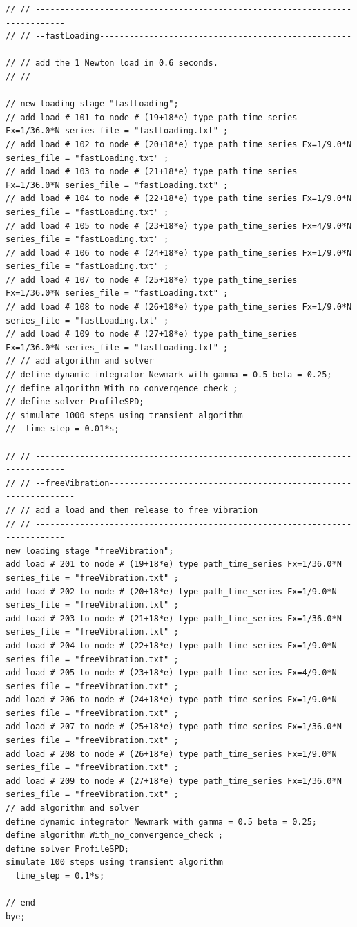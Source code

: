 \documentclass[fleqn,11pt]{article}
\begin{document}
\begin{lstlisting}
// // ----------------------------------------------------------------------------
// // --fastLoading---------------------------------------------------------------
// // add the 1 Newton load in 0.6 seconds.
// // ----------------------------------------------------------------------------
// new loading stage "fastLoading";
// add load # 101 to node # (19+18*e) type path_time_series Fx=1/36.0*N series_file = "fastLoading.txt" ; 
// add load # 102 to node # (20+18*e) type path_time_series Fx=1/9.0*N series_file = "fastLoading.txt" ; 
// add load # 103 to node # (21+18*e) type path_time_series Fx=1/36.0*N series_file = "fastLoading.txt" ; 
// add load # 104 to node # (22+18*e) type path_time_series Fx=1/9.0*N series_file = "fastLoading.txt" ; 
// add load # 105 to node # (23+18*e) type path_time_series Fx=4/9.0*N series_file = "fastLoading.txt" ; 
// add load # 106 to node # (24+18*e) type path_time_series Fx=1/9.0*N series_file = "fastLoading.txt" ; 
// add load # 107 to node # (25+18*e) type path_time_series Fx=1/36.0*N series_file = "fastLoading.txt" ; 
// add load # 108 to node # (26+18*e) type path_time_series Fx=1/9.0*N series_file = "fastLoading.txt" ; 
// add load # 109 to node # (27+18*e) type path_time_series Fx=1/36.0*N series_file = "fastLoading.txt" ; 
// // add algorithm and solver
// define dynamic integrator Newmark with gamma = 0.5 beta = 0.25;
// define algorithm With_no_convergence_check ;
// define solver ProfileSPD;
// simulate 1000 steps using transient algorithm 
//  time_step = 0.01*s;

// // ----------------------------------------------------------------------------
// // --freeVibration---------------------------------------------------------------
// // add a load and then release to free vibration
// // ----------------------------------------------------------------------------
new loading stage "freeVibration";
add load # 201 to node # (19+18*e) type path_time_series Fx=1/36.0*N series_file = "freeVibration.txt" ; 
add load # 202 to node # (20+18*e) type path_time_series Fx=1/9.0*N series_file = "freeVibration.txt" ; 
add load # 203 to node # (21+18*e) type path_time_series Fx=1/36.0*N series_file = "freeVibration.txt" ; 
add load # 204 to node # (22+18*e) type path_time_series Fx=1/9.0*N series_file = "freeVibration.txt" ; 
add load # 205 to node # (23+18*e) type path_time_series Fx=4/9.0*N series_file = "freeVibration.txt" ; 
add load # 206 to node # (24+18*e) type path_time_series Fx=1/9.0*N series_file = "freeVibration.txt" ; 
add load # 207 to node # (25+18*e) type path_time_series Fx=1/36.0*N series_file = "freeVibration.txt" ; 
add load # 208 to node # (26+18*e) type path_time_series Fx=1/9.0*N series_file = "freeVibration.txt" ; 
add load # 209 to node # (27+18*e) type path_time_series Fx=1/36.0*N series_file = "freeVibration.txt" ; 
// add algorithm and solver
define dynamic integrator Newmark with gamma = 0.5 beta = 0.25;
define algorithm With_no_convergence_check ;
define solver ProfileSPD;
simulate 100 steps using transient algorithm 
  time_step = 0.1*s;

// end
bye;
\end{lstlisting}
\end{document}
